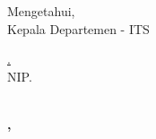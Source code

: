 \endgroup
\vspace{-1ex}
\begin{center}
  Mengetahui, \\
  Kepala Departemen \department{} \facultyshort{} - ITS\\

  \vspace{5ex}

  \underline{\headofdepartment{}.} \\
  NIP. \headofdepartmentnip{}
\end{center}
\vspace{-1ex}
\begin{center}
  \textbf{\MakeUppercase{\place{}}\\\MONTH{}, \the\year{}}
\end{center}
\endgroup

